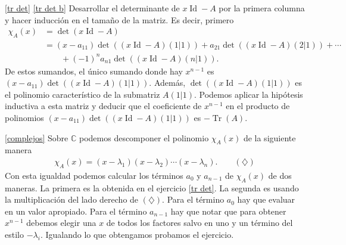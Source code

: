 \ref{tr det} \ref{tr det b} Desarrollar el determinante de $x\operatorname{Id}-A$ por la primera columna y hacer inducción en el tamaño de la matriz. Es decir, primero
\begin{align*}
\chi_A(x) &= \det(x\operatorname{Id}-A)\\
&=(x-a_{11})\det((x\operatorname{Id}-A)(1|1))+a_{21}\det((x\operatorname{Id}-A)(2|1))+\cdots\\
&\qquad+(-1)^n a_{n1}\det((x\operatorname{Id}-A)(n|1)).
\end{align*}
De estos sumandos, el único sumando donde hay $x^{n-1}$ es $(x-a_{11})\det((x\operatorname{Id}-A)(1|1))$. Además, $\det((x\operatorname{Id}-A)(1|1))$ es el polinomio característico de la submatriz $A(1|1)$. Podemos aplicar la hipótesis inductiva a esta matriz y deducir que el coeficiente de $x^{n-1}$ en el producto de polinomios $(x-a_{11})\det((x\operatorname{Id}-A)(1|1))$ es $- \operatorname{Tr}(A)$.



\ref{complejos} Sobre $\mathbb{C}$ podemos descomponer el polinomio $\chi_A(x)$ de la siguiente manera
\begin{align*}
\chi_A(x)=(x-\lambda_1)(x-\lambda_2)\cdots(x-\lambda_n). \qquad (\diamondsuit)
\end{align*}
Con esta igualdad podemos calcular los términos $a_0$ y $a_{n-1}$ de $\chi_A(x)$ de dos maneras. La primera es la obtenida en el ejercicio \ref{tr det}. La segunda es usando la multiplicación del lado derecho de $(\diamondsuit)$. Para el término $a_0$ hay que evaluar en un valor apropiado. Para el término $a_{n-1}$ hay que notar que para obtener $x^{n-1}$ debemos elegir una $x$ de todos los factores salvo en uno y un término del estilo $-\lambda_i$. Igualando lo que obtengamos probamos el ejercicio.

